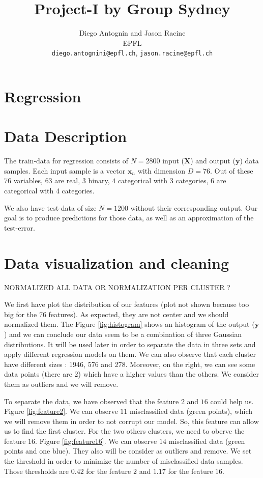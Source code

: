 \documentclass{article} %
\title{Project-I by Group Sydney}
\author{
Diego Antognin and Jason Racine \\
EPFL \\
\texttt{diego.antognini@epfl.ch}, \texttt{jason.racine@epfl.ch} \\
}
\begin{document}
\maketitle

\begin{abstract}

\end{abstract}

\section{Regression}

\section{Data Description}

The train-data for regression consists of $N = 2800$ input ($\mathbf{X}$) and output ($\mathbf{y}$) data samples. Each input sample is a vector $\mathbf{x}_n$ with dimension $D = 76$. Out of these $76$ variables, $63$ are real, $3$ binary, $4$ categorical with 3 categories, $6$ are categorical with 4 categories.

We also have test-data of size $N=1200$ without their corresponding output. Our goal is to produce predictions for those data, as well as an approximation of the test-error.

\section{Data visualization and cleaning}

NORMALIZED ALL DATA OR NORMALIZATION PER CLUSTER ?

We first have plot the distribution of our features (plot not shown because too big for the $76$ features). As expected, they are not center and we should normalized them. The Figure \ref{fig:histogram} shows an histogram of the output ($\mathbf{y}$) and we can conclude our data  seem to be a combination of three Gaussian distributions. It will be used later in order to separate the data in three sets and apply different regression models on them. We can also observe that each cluster have different sizes : 1946, 576 and 278. Moreover, on the right, we can see some data points (there are $2$) which have a higher values than the others. We consider them as outliers and we will remove.

To separate the data, we have observed that the feature $2$ and $16$ could help us. Figure \ref{fig:feature2}. We can observe $11$ misclassified data (green points), which we will remove them in order to not corrupt our model.  So, this feature can allow us to find the first cluster. For the two others clusters, we need to oberve the feature $16$. Figure \ref{fig:feature16}. We can observe $14$ misclassified data (green points and one blue). They also will be consider as outliers and remove. We set the threshold in order to minimize the number of misclassified data samples. Those thresholds are $0.42$ for the feature $2$ and $1.17$ for the feature $16$.
\end{document}
